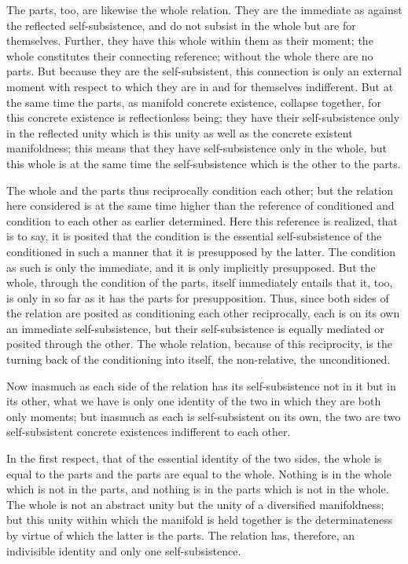 The parts, too, are likewise the whole relation.
They are the immediate as against
the reflected self-subsistence,
and do not subsist in the whole
but are for themselves.
Further, they have this whole within them as their moment;
the whole constitutes their connecting reference;
without the whole there are no parts.
But because they are the self-subsistent,
this connection is only an external moment
with respect to which they are
in and for themselves indifferent.
But at the same time the parts,
as manifold concrete existence, collapse together,
for this concrete existence is reflectionless being;
they have their self-subsistence
only in the reflected unity
which is this unity as well as
the concrete existent manifoldness;
this means that they have
self-subsistence only in the whole,
but this whole is at the same time the
self-subsistence which is the other to the parts.

The whole and the parts thus
reciprocally condition each other;
but the relation here considered is
at the same time higher than the
reference of conditioned and condition
to each other as earlier determined.
Here this reference is realized, that is to say,
it is posited that the condition is
the essential self-subsistence of the conditioned
in such a manner that it is presupposed by the latter.
The condition as such is only the immediate,
and it is only implicitly presupposed.
But the whole, through the condition of the parts,
itself immediately entails that it, too,
is only in so far as it has
the parts for presupposition.
Thus, since both sides of the relation
are posited as conditioning each other reciprocally,
each is on its own an immediate self-subsistence,
but their self-subsistence is equally
mediated or posited through the other.
The whole relation, because of this reciprocity,
is the turning back of the conditioning into itself,
the non-relative, the unconditioned.

Now inasmuch as each side of the relation has
its self-subsistence not in it but in its other,
what we have is only one identity of the two
in which they are both only moments;
but inasmuch as each is self-subsistent on its own,
the two are two self-subsistent concrete existences
indifferent to each other.

In the first respect, that of
the essential identity of the two sides,
the whole is equal to the parts
and the parts are equal to the whole.
Nothing is in the whole which is not in the parts,
and nothing is in the parts which is not in the whole.
The whole is not an abstract unity
but the unity of a diversified manifoldness;
but this unity within which the manifold is
held together is the determinateness
by virtue of which the latter is the parts.
The relation has, therefore, an indivisible identity
and only one self-subsistence.


